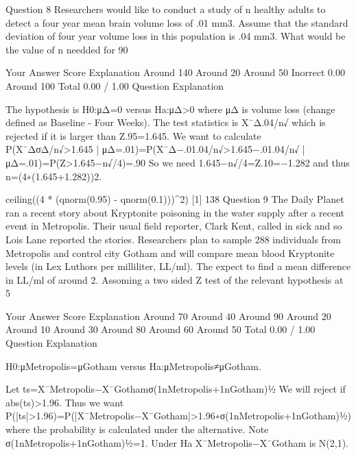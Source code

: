 Question 8
Researchers would like to conduct a study of n healthy adults to detect a four year mean brain volume loss of .01 mm3. Assume that the standard deviation of four year volume loss in this population is .04 mm3. What would be the value of n needded for 90%

Your Answer                Score        Explanation
Around 140                        
Around 20                        
Around 50        Inorrect        0.00        
Around 100                        
Total                0.00 / 1.00        
Question Explanation

The hypothesis is H0:μΔ=0 versus Ha:μΔ>0 where μΔ is volume loss (change defined as Baseline - Four Weeks). The test statistics is X¯Δ.04/n√ which is rejected if it is larger than Z.95=1.645.
We want to calculate
P(X¯ΔσΔ/n√>1.645 | μΔ=.01)=P(X¯Δ−.01.04/n√>1.645−.01.04/n√ | μΔ=.01)=P(Z>1.645−n√/4)=.90
So we need 1.645−n√/4=Z.10=−1.282 and thus n=(4∗(1.645+1.282))2.

ceiling((4 * (qnorm(0.95) - qnorm(0.1)))^2)
[1] 138
Question 9
The Daily Planet ran a recent story about Kryptonite poisoning in the water supply after a recent event in Metropolis. Their usual field reporter, Clark Kent, called in sick and so Lois Lane reported the stories. Researchers plan to sample 288 individuals from Metropolis and control city Gotham and will compare mean blood Kryptonite levels (in Lex Luthors per milliliter, LL/ml). The expect to find a mean difference in LL/ml of around 2. Assoming a two sided Z test of the relevant hypothesis at 5%

Your Answer                Score        Explanation
Around 70%
Around 40%
Around 90%
Around 20%
Around 10%
Around 30%
Around 80%
Around 60%
Around 50%
Total                0.00 / 1.00        
Question Explanation

H0:μMetropolis=μGotham versus Ha:μMetropolis≠μGotham.

Let
ts=X¯Metropolis−X¯Gothamσ(1nMetropolis+1nGotham)½
We will reject if abs(ts)>1.96. Thus we want
P(|ts|>1.96)=P(|X¯Metropolis−X¯Gotham|>1.96∗σ(1nMetropolis+1nGotham)½)
where the probability is calculated under the alternative. Note σ(1nMetropolis+1nGotham)½=1. Under Ha X¯Metropolis−X¯Gotham is N(2,1).

